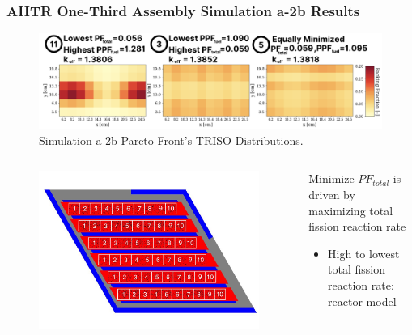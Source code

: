 \begin{frame}
    \frametitle{AHTR One-Third Assembly Simulation a-2b Results}
    \vspace{-0.4cm}
    \begin{figure}
        \centering
        \includegraphics[width=\linewidth]{figures/a-2b-comparison-reactors.png}
        \caption{Simulation a-2b Pareto Front's TRISO Distributions.}
    \end{figure}
    \vspace{-0.7cm}
    \begin{columns}
        \begin{column}{0.4\linewidth}
            \begin{figure}
                \centering
                \includegraphics[width=\linewidth]{../docs/figures/ahtr_assembly.png} 
            \end{figure}
        \end{column}
        \begin{column}{0.6\linewidth}
            Minimize $PF_{total}$ is driven by maximizing total fission reaction rate 
            \begin{itemize}
                \item High to lowest total fission reaction rate: reactor model 

\end{itemize}
\end{column}
\end{columns}
\end{frame}
